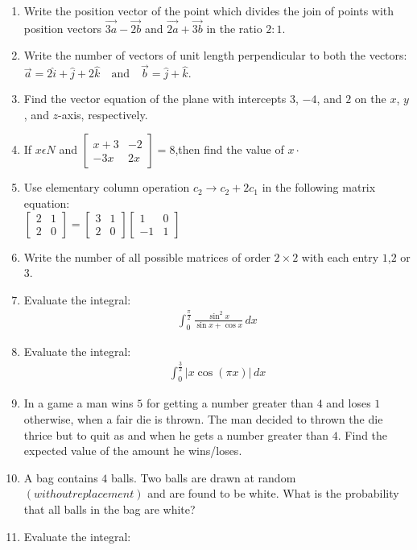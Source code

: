 \documentclass{article}
\providecommand{\myvec}[1]{\ensuremath{\begin{bmatrix}#1\end{bmatrix}}}
\providecommand{\brak}[1]{\ensuremath{\left(#1\right)}}
\begin{document}
\begin{enumerate}
\item Write the position vector of the point which divides the join of points with position vectors $ \overrightarrow{3a} -\overrightarrow{2b} $ and $ \overrightarrow{2a}+\overrightarrow{3b} $ in the ratio $ 2:1 $.
\item Write the number of vectors of unit length perpendicular to both the vectors:
$
\vec{a} = 2\hat{i} + \hat{j} + 2\hat{k} \quad \text{and} \quad \vec{b} = \hat{j} + \hat{k}.
$
\item Find the vector equation of the plane with intercepts $3$, $-4$, and $2$ on the $x$, $y$, and $z$-axis, respectively.
\item If $x$$\epsilon N$ and $\myvec{x+3 & -2\\ -3x & 2x}=8$,then find the value of $x\cdot$
\item Use elementary column operation $c_2 \rightarrow c_{2}+2c_{1}$ in the following  matrix  equation:\\ $\myvec{2 & 1 \\ 2 & 0}=\myvec{3 & 1 \\ 2 & 0}\myvec{1 & 0 \\ -1 & 1}$
\item  Write the number of all possible matrices of order \(2\times 2\) with each entry $1$,$2$ or $3$.

\item Evaluate the integral:
	\begin{align*}
\int_{0}^{\frac{\pi}{2}} \frac{\sin^2 x}{\sin x + \cos x} \, dx
	\end{align*}
\item Evaluate the integral:
	\begin{align*}
		\int_{0}^\frac{3}{2}\left| x \cos(\pi x) \right| \, dx
	\end{align*}
\item In a game a man wins  \rupee $5$  for getting a number greater than $4$ and loses  \rupee $1$ otherwise, when a fair die is thrown. The man decided to thrown the die thrice but to quit as and when he gets a number greater than $4$. Find the expected value of the amount he wins/loses.
\item  A bag contains $4$ balls. Two balls are drawn at random $\brak{without replacement}$ and are found to be white. What is the probability that all balls in the bag are white?
\item Evaluate the integral:


\end{enumerate}
\end{document}
